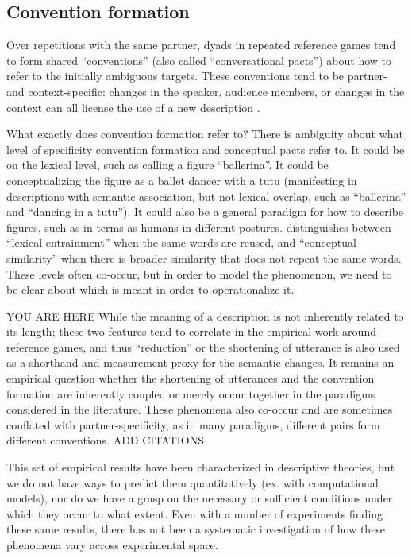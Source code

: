 \documentclass[]{article}
\begin{document}
\subsection{Convention formation}
Over repetitions with the same partner, dyads in repeated reference games tend to form shared ``conventions'' (also called ``conversational pacts'') about how to refer to the initially ambiguous targets. These conventions tend to be partner- and context-specific: changes in the speaker, audience members, or changes in the context can all license the use of a new description \citep{metzing2003a, ibarra2016, yoon2014}.

What exactly does convention formation refer to? There is ambiguity about what level of specificity convention formation and conceptual pacts refer to. It could be on the lexical level, such as calling a figure ``ballerina''. It could be conceptualizing the figure as a ballet dancer with a tutu (manifesting in descriptions with semantic association, but not lexical overlap, such as ``ballerina'' and ``dancing in a tutu''). It could also be a general paradigm for how to describe figures, such as in terms as humans in different postures.  \cite{horton2002a} distinguishes between ``lexical entrainment'' when the same words are reused, and ``conceptual similarity'' when there is broader similarity that does not repeat the same words. These levels often co-occur, but in order to model the phenomenon, we need to be clear about which is meant in order to operationalize it.  

YOU ARE HERE
While the meaning of a description is not inherently related to its length; these two features tend to correlate in the empirical work around reference games, and thus ``reduction'' or the shortening of utterance is also used as a shorthand and measurement proxy for the semantic changes. It remains an empirical question whether the shortening of utterances and the convention formation are inherently coupled or merely occur together in the paradigms considered in the literature. These phenomena also co-occur and are sometimes conflated with partner-specificity, as in many paradigms, different pairs form different conventions. ADD CITATIONS

This set of empirical results have been characterized in descriptive theories, but we do not have ways to predict them quantitatively (ex. with computational models), nor do we have a grasp on the necessary or sufficient conditions under which they occur to what extent. Even with a number of experiments finding these same results, there has not been a systematic investigation of how these phenomena vary across experimental space. 
\end{document}
